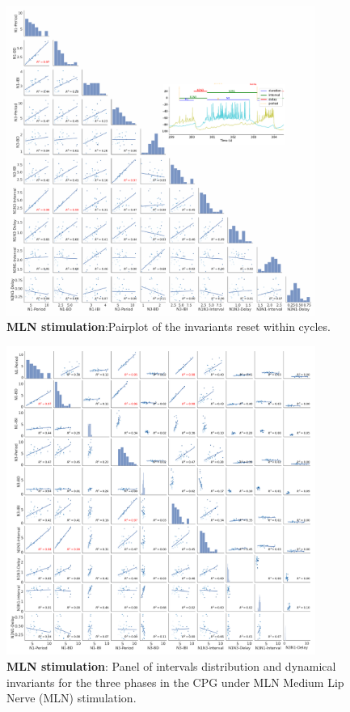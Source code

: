 \begin{figure}[htbp]
	\centering
	\includegraphics[width=0.9\textwidth]{./invariants/data/SUSSEX/MLN_driven/images/panel_with_pairplot.pdf}
	\caption{\textbf{MLN stimulation}:Pairplot of the invariants reset within cycles.}
	\label{fig:mln stimulation pairplot}
\end{figure}




\begin{figure}[htbp]
	\centering
	\includegraphics[width=0.9\textwidth]{./invariants/data/SUSSEX/MLN_driven/images/_output_pairplot_reset.png}
	\caption{\textbf{MLN stimulation}: Panel of intervals distribution and dynamical invariants for the three phases in the CPG under MLN Medium Lip Nerve (MLN) stimulation.}
	\label{fig:mln stimulation reset pairplot}
\end{figure}


